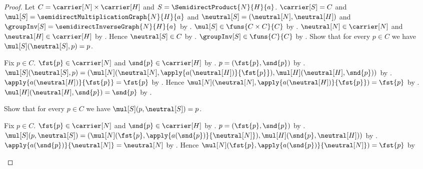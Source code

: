 \begin{proof}
    Let $C=\carrier[N]\times\carrier[H]$ and
        $S=\SemidirectProduct{N}{H}{a}$.
    $\carrier[S]=C$ and
        $\mul[S]=\semidirectMultiplicationGraph{N}{H}{a}$ and
        $\neutral[S]=(\neutral[N],\neutral[H])$ and
        $\groupInv[S]=\semidirectInverseGraph{N}{H}{a}$ by
        .
    $\mul[S]\in\funs{C\times C}{C}$ by
        .
    $\neutral[N]\in\carrier[N]$ and
        $\neutral[H]\in\carrier[H]$ by
        .
    Hence $\neutral[S]\in C$ by .
    $\groupInv[S]\in\funs{C}{C}$ by
        .
    Show that for every $p\in C$ we have
        $\mul[S](\neutral[S],p)=p$.
    \begin{subproof}
        Fix $p\in C$.
        $\fst{p}\in\carrier[N]$ and $\snd{p}\in\carrier[H]$ by
            .
        $p=(\fst{p},\snd{p})$ by
            .
        $\mul[S](\neutral[S],p)=
            (\mul[N](\neutral[N],
                \apply{a(\neutral[H])}{\fst{p}}),
             \mul[H](\neutral[H],\snd{p}))$ by
            .
        $\apply{a(\neutral[H])}{\fst{p}}=\fst{p}$ by
            .
        Hence
            $\mul[N](\neutral[N],
                \apply{a(\neutral[H])}{\fst{p}})=\fst{p}$ by
            .
        $\mul[H](\neutral[H],\snd{p})=\snd{p}$ by
            .
    \end{subproof}
    Show that for every $p\in C$ we have
        $\mul[S](p,\neutral[S])=p$.
    \begin{subproof}
        Fix $p\in C$.
        $\fst{p}\in\carrier[N]$ and $\snd{p}\in\carrier[H]$ by
            .
        $p=(\fst{p},\snd{p})$ by
            .
        $\mul[S](p,\neutral[S])=
            (\mul[N](\fst{p},
                \apply{a(\snd{p})}{\neutral[N]}),
             \mul[H](\snd{p},\neutral[H]))$ by
            .
        $\apply{a(\snd{p})}{\neutral[N]}=\neutral[N]$ by
            .
        Hence
            $\mul[N](\fst{p},
                \apply{a(\snd{p})}{\neutral[N]})=\fst{p}$ by

\end{subproof}
\end{proof}

